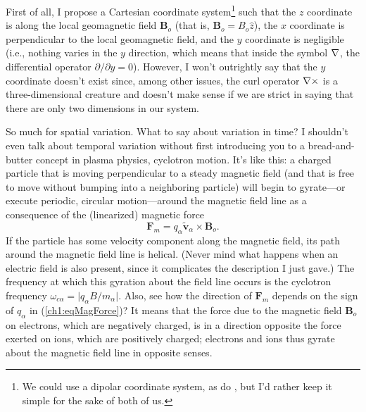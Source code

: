 First of all, I propose a Cartesian coordinate system\footnote{We could use a
  dipolar coordinate system, as do \citet{Lysak2013}, but I'd rather keep it
  simple for the sake of both of us.} such that the $z$ coordinate is along the
local geomagnetic field $\mathbf{B}_o$ (that is, $\mathbf{B}_o = B_o \hat{z}$),
the $x$ coordinate is perpendicular to the local geomagnetic field, and the $y$
coordinate is negligible (i.e., nothing varies in the $y$ direction, which means
that inside the symbol ${\bf \nabla}$, the differential operator $\partial / \partial y
= 0$). However, I won't outrightly say that the $y$ coordinate doesn't exist
since, among other issues, the curl operator ${\bf \nabla} \times$ is a
three-dimensional creature and doesn't make sense if we are strict in saying
that there are only two dimensions in our system.

So much for spatial variation. What to say about variation in time? I shouldn't
even talk about temporal variation without first introducing you to a
bread-and-butter concept in plasma physics, cyclotron motion. It's like this: a
charged particle that is moving perpendicular to a steady magnetic field (and
that is free to move without bumping into a neighboring particle) will begin to
gyrate---or execute periodic, circular motion---around the magnetic field line
as a consequence of the (linearized) magnetic force
\begin{equation} \label{ch1:eqMagForce} 
\mathbf{F}_m = q_\alpha \mathbf{\tilde v}_\alpha \times \mathbf{B}_o.
\end{equation} 
If the particle has some velocity component along the magnetic field, its path
around the magnetic field line is helical. (Never mind what happens when an
electric field is also present, since it complicates the description I just
gave.) The frequency at which this gyration about the field line occurs is the
cyclotron frequency $\omega_{c \alpha} = \vert q_\alpha B /m_\alpha \vert$.
Also, see how the direction of $\mathbf{F}_m$ depends on the sign of $q_\alpha$
in (\ref{ch1:eqMagForce})? It means that the force due to the magnetic field
$\mathbf{B}_o$ on electrons, which are negatively charged, is in a direction
opposite the force exerted on ions, which are positively charged; electrons and
ions thus gyrate about the magnetic field line in opposite senses.

